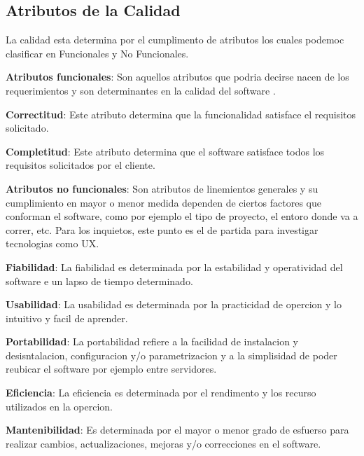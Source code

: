 \documentclass[12pt,a4paper,twoside]{article}
\begin{document}
\subsection{Atributos de la Calidad}
La calidad esta determina por el cumplimento de atributos los cuales podemoc clasificar en Funcionales y No Funcionales.
\begin{list}{•}{}
\item \textbf{Atributos funcionales}: Son aquellos atributos que podria decirse nacen de los requerimientos y son determinantes en la calidad del software .
\begin{list}{•}{}
\item \textbf{Correctitud}: Este atributo determina que la funcionalidad satisface el requisitos solicitado.
\item \textbf{Completitud}: Este atributo determina que el software satisface todos los requisitos solicitados por el cliente.
\end{list}
\item \textbf{Atributos no funcionales}: Son atributos de linemientos generales y su cumplimiento en mayor o menor medida dependen de ciertos factores que conforman el software, como por ejemplo el tipo de proyecto, el entoro donde va a correr, etc. Para los inquietos, este punto es el de partida para investigar tecnologias como UX.
\begin{list}{•}{}
\item \textbf{Fiabilidad}: La fiabilidad es determinada por la estabilidad y operatividad del software e un lapso de tiempo determinado.
\item \textbf{Usabilidad}: La usabilidad es determinada por la practicidad de opercion y  lo intuitivo y facil de aprender. 
\item \textbf{Portabilidad}: La portabilidad refiere a la facilidad de instalacion y desisntalacion, configuracion y/o parametrizacion y a la simplisidad de poder reubicar el software por ejemplo entre servidores.
\item \textbf{Eficiencia}: La eficiencia es determinada por el rendimento y los recurso utilizados en la opercion.
\item \textbf{Mantenibilidad}: Es determinada por el mayor o menor grado de esfuerso para realizar cambios, actualizaciones, mejoras y/o correcciones en el software.
\end{list}
\end{list}
\vspace*{\fill}
\end{document}
